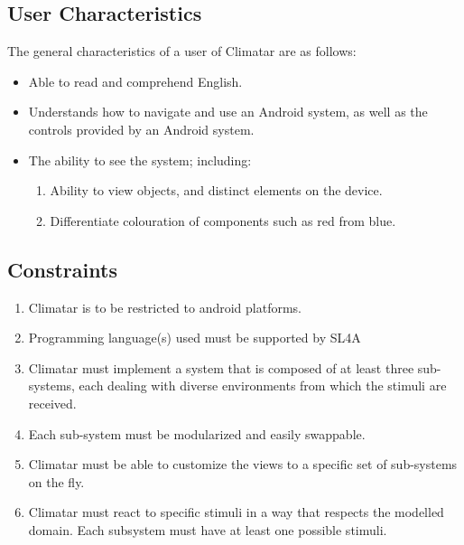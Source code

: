 \documentclass[]{article}
\begin{document}
\subsection{User Characteristics}
\label{sub:user_characteristics}
The general characteristics of a user of Climatar are as follows:
\begin{itemize}
	\item Able to read and comprehend English.
	\item Understands how to navigate and use an Android system, as 	well as the controls provided by an Android system.
	\item The ability to see the system; including:
	\begin{enumerate}[-]
		\item Ability to view objects, and distinct elements on the device.
		\item Differentiate colouration of components such as red from blue.
	\end{enumerate}
\end{itemize}

\subsection{Constraints}
\label{sub:constraints}
\begin{enumerate}
	\item Climatar is to be restricted to android platforms.
	\item Programming language(s) used must be supported by SL4A
	\item  Climatar must implement a system that is composed of at least three sub-systems, each dealing with diverse environments from which the stimuli are received.
	\item Each sub-system must be modularized and easily swappable.
	\item Climatar must be able to customize the views to a specific set of sub-systems on the fly.
	\item  Climatar must react to specific stimuli in a way that respects the modelled domain.  Each subsystem must have at least one possible stimuli.
\end{enumerate}
\end{document}
